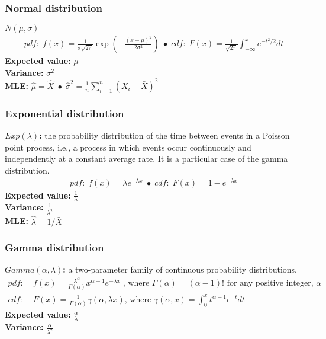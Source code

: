 \documentclass{article}
\begin{document}
\subsubsection{Normal distribution}
\textbf{$N(\mu, \sigma)$}
\begin{align*}
    pdf: \; f(x) = \frac{1}{\sigma \sqrt{2 \pi}} \exp \left (-\frac{(x - \mu)^2}{2 \sigma ^ 2}\right ) \;\bullet\;
    cdf: \; F(x) = \frac{1}{\sqrt{2 \pi}} \int_{- \infty}^x e^{-t^2 / 2} dt
\end{align*}
\textbf{Expected value:} $\mu$\\
\textbf{Variance:} $\sigma^2$\\
\textbf{MLE:} $\hat{\mu} = \hat{X} \; \bullet \; \hat{\sigma}^2 = \frac{1}{n}\sum_{i=1}^n(X_i - \bar{X})^2$

\subsubsection{Exponential distribution}
\textbf{$Exp(\lambda)$:} the probability distribution of the time between events in a Poisson point process, i.e., a process in which events occur continuously and independently at a constant average rate. It is a particular case of the gamma distribution.
\begin{align*}
    pdf: \; f(x) = \lambda e^{-\lambda x} \;\bullet\; cdf: \; F(x) = 1 - e^{-\lambda x}
\end{align*}
\textbf{Expected value:} $\frac{1}{\lambda}$\\
\textbf{Variance:} $\frac{1}{\lambda^2}$\\
\textbf{MLE:} $\hat{\lambda} = 1 / \bar{X}$

\subsubsection{Gamma distribution}
\textbf{$Gamma(\alpha, \lambda)$:} a two-parameter family of continuous probability distributions.
\begin{align*}
    pdf: & \; f(x) = \frac{\lambda^{\alpha}}{\Gamma(\alpha)}x^{\alpha-1} e^{-\lambda x} \; \textrm{, where } \Gamma(\alpha) = (\alpha - 1)! \textrm{ for any positive integer, } \alpha\\
    cdf: & \; F(x) =  \frac{1}{\Gamma(\alpha)}\gamma(\alpha, \lambda x) \textrm{, where } \gamma(\alpha, x) = \int_0^x t^{\alpha - 1}e^{-t}dt
\end{align*}
\textbf{Expected value:} $\frac{\alpha}{\lambda}$\\
\textbf{Variance:} $\frac{\alpha}{\lambda^2}$
\end{document}
